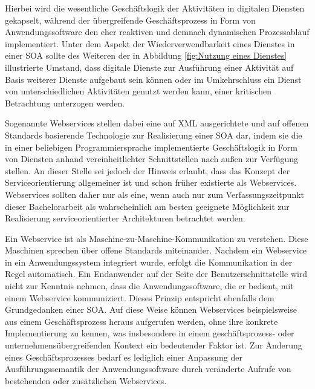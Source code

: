 Hierbei wird die wesentliche Geschäftslogik der Aktivitäten in digitalen Diensten gekapselt, während der übergreifende Geschäftsprozess in Form von Anwendungssoftware den eher reaktiven und demnach dynamischen Prozessablauf implementiert. 
\cite{Teusch.2016}
Unter dem Aspekt der Wiederverwendbarkeit eines Dienstes in einer \ac{SOA} sollte des Weiteren der in Abbildung \ref{fig:Nutzung eines Dienstes} illustrierte Umstand, dass digitale Dienste zur Ausführung einer Aktivität auf Basis weiterer Dienste aufgebaut sein können oder im Umkehrschluss ein Dienst von unterschiedlichen Aktivitäten genutzt werden kann, einer kritischen Betrachtung unterzogen werden.
\cite{Masak.2007}

Sogenannte Webservices stellen dabei eine auf \ac{XML} ausgerichtete und auf offenen Standards basierende Technologie zur Realisierung einer \ac{SOA} dar, indem sie die in einer beliebigen Programmiersprache implementierte Geschäftslogik in Form von Diensten anhand vereinheitlichter Schnittstellen nach außen zur Verfügung stellen.
\cite{Masak.2005}
An dieser Stelle sei jedoch der Hinweis erlaubt, dass das Konzept der Serviceorientierung allgemeiner ist und schon früher existierte als Webservices. Webservices sollten daher nur als eine, wenn auch nur zum Verfassungszeitpunkt dieser Bachelorarbeit als wahrscheinlich am besten geeignete Möglichkeit zur Realisierung serviceorientierter Architekturen betrachtet werden.

Ein Webservice ist als Maschine-zu-Maschine-Kommunikation zu verstehen. Diese Maschinen sprechen über offene Standards miteinander. 
\cite{Finger.2009b}
Nachdem ein Webservice in ein Anwendungssystem integriert wurde, erfolgt die Kommunikation in der Regel automatisch. 
Ein Endanwender auf der Seite der Benutzerschnittstelle wird nicht zur Kenntnis nehmen, dass die Anwendungssoftware, die er bedient, mit einem Webservice kommuniziert. Dieses Prinzip entspricht ebenfalls dem Grundgedanken einer \ac{SOA}.
\cite{Teusch.2016}
Auf diese Weise können Webservices beispielsweise aus einem Geschäftsprozess heraus aufgerufen werden, ohne ihre konkrete Implementierung zu kennen, was insbesondere in einem geschäftsprozess- oder unternehmensübergreifenden Kontext ein bedeutender Faktor ist. Zur Änderung eines Geschäftsprozesses bedarf es lediglich einer Anpassung der Ausführungssemantik der Anwendungssoftware durch veränderte Aufrufe von bestehenden oder zusätzlichen Webservices.


